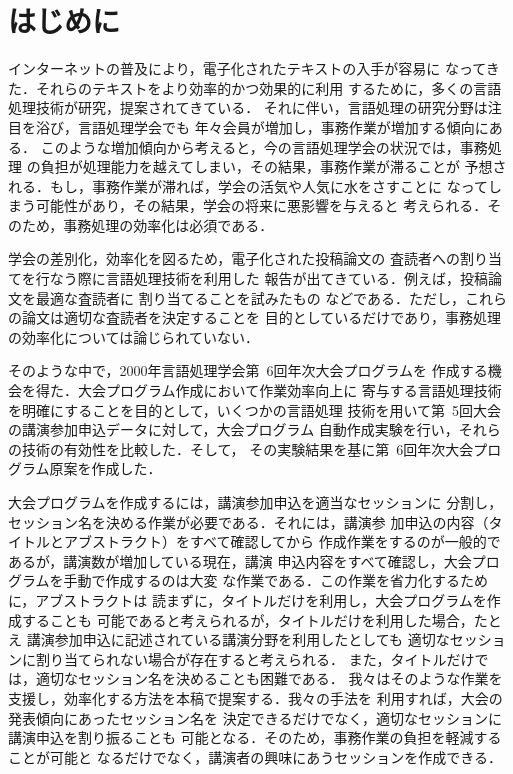 


\maketitle
\thispagestyle{empty}
\section{はじめに}
インターネットの普及により，電子化されたテキストの入手が容易に
なってきた．それらのテキストをより効率的かつ効果的に利用
するために，多くの言語処理技術が研究，提案されてきている．
それに伴い，言語処理の研究分野は注目を浴び，言語処理学会でも
年々会員が増加し，事務作業が増加する傾向にある．
このような増加傾向から考えると，今の言語処理学会の状況では，事務処理
の負担が処理能力を越えてしまい，その結果，事務作業が滞ることが
予想される．もし，事務作業が滞れば，学会の活気や人気に水をさすことに
なってしまう可能性があり，その結果，学会の将来に悪影響を与えると
考えられる．そのため，事務処理の効率化は必須である．

学会の差別化，効率化を図るため，電子化された投稿論文の
査読者への割り当てを行なう際に言語処理技術を利用した
報告が出てきている．例えば，投稿論文を最適な査読者に
割り当てることを試みたもの\cite{Susan1992,Yarowsky1999}
などである．ただし，これらの論文は適切な査読者を決定することを
目的としているだけであり，事務処理の効率化については論じられていない．

そのような中で，2000年言語処理学会第\ 6回年次大会プログラムを
作成する機会を得た．大会プログラム作成において作業効率向上に
寄与する言語処理技術を明確にすることを目的として，いくつかの言語処理
技術を用いて第\ 5回大会の講演参加申込データに対して，大会プログラム
自動作成実験を行い，それらの技術の有効性を比較した．そして，
その実験結果を基に第\ 6回年次大会プログラム原案を作成した．

大会プログラムを作成するには，講演参加申込を適当なセッションに
分割し，セッション名を決める作業が必要である．それには，講演参
加申込の内容（タイトルとアブストラクト）をすべて確認してから
作成作業をするのが一般的であるが，講演数が増加している現在，講演
申込内容をすべて確認し，大会プログラムを手動で作成するのは大変
な作業である．この作業を省力化するために，アブストラクトは
読まずに，タイトルだけを利用し，大会プログラムを作成することも
可能であると考えられるが，タイトルだけを利用した場合，たとえ
講演参加申込に記述されている講演分野を利用したとしても
適切なセッションに割り当てられない場合が存在すると考えられる．
また，タイトルだけでは，適切なセッション名を決めることも困難である．
我々はそのような作業を支援し，効率化する方法を本稿で提案する．我々の手法を
利用すれば，大会の発表傾向にあったセッション名を
決定できるだけでなく，適切なセッションに講演申込を割り振ることも
可能となる．そのため，事務作業の負担を軽減することが可能と
なるだけでなく，講演者の興味にあうセッションを作成できる．


